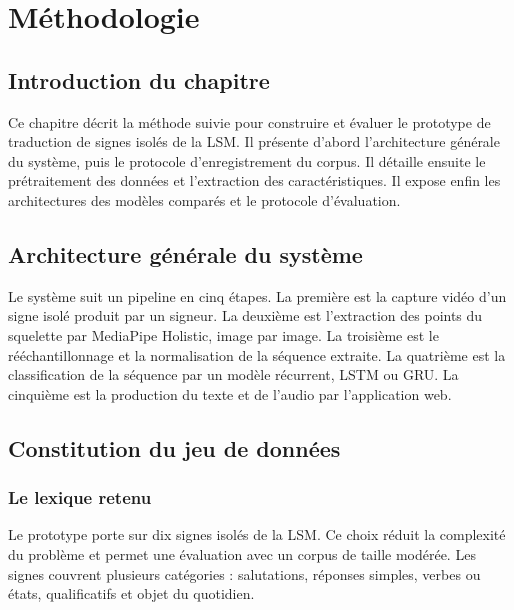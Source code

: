 \chapter{Méthodologie}

\section{Introduction du chapitre}

Ce chapitre décrit la méthode suivie pour construire et évaluer le prototype de traduction de signes isolés de la LSM. Il présente d'abord l'architecture générale du système, puis le protocole d'enregistrement du corpus. Il détaille ensuite le prétraitement des données et l'extraction des caractéristiques. Il expose enfin les architectures des modèles comparés et le protocole d'évaluation.

\section{Architecture générale du système}

Le système suit un pipeline en cinq étapes. La première est la capture vidéo d'un signe isolé produit par un signeur. La deuxième est l'extraction des points du squelette par MediaPipe Holistic, image par image. La troisième est le rééchantillonnage et la normalisation de la séquence extraite. La quatrième est la classification de la séquence par un modèle récurrent, LSTM ou GRU. La cinquième est la production du texte et de l'audio par l'application web.

\section{Constitution du jeu de données}

\subsection{Le lexique retenu}

Le prototype porte sur dix signes isolés de la LSM. Ce choix réduit la complexité du problème et permet une évaluation avec un corpus de taille modérée. Les signes couvrent plusieurs catégories : salutations, réponses simples, verbes ou états, qualificatifs et objet du quotidien.

